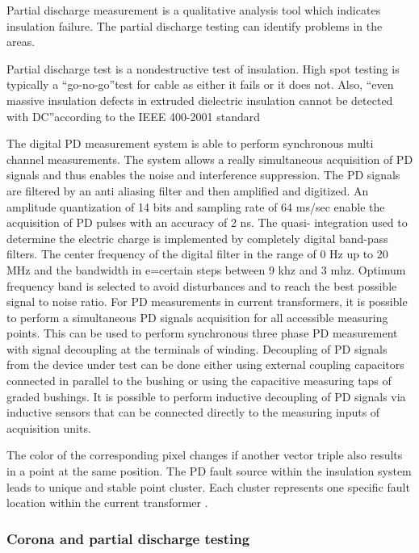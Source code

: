 Partial discharge measurement is a qualitative analysis tool which indicates insulation failure. The partial discharge testing can identify problems in the areas.

Partial discharge test is a nondestructive test of insulation. High spot testing is typically a \textquotedblleft go-no-go\textquotedblright test for cable as either it fails or it does not. Also, \textquotedblleft even massive insulation defects in extruded dielectric insulation cannot be detected with DC\textquotedblright according to the IEEE 400-2001 standard \cite{sundermannline}

The digital PD measurement system is able to perform synchronous multi channel measurements. The system allows a really simultaneous acquisition of PD signals and thus enables the noise and interference suppression. The PD signals are filtered by an anti aliasing filter and then amplified and digitized. An amplitude quantization of 14 bits and sampling rate of 64 ms/sec enable the acquisition of PD pulses with an accuracy of 2 ns. The quasi- integration used to determine the electric charge is implemented by completely digital band-pass filters. The center frequency of the digital filter in the range of 0 Hz up to 20 MHz and the bandwidth in e=certain steps between 9 khz and 3 mhz. Optimum frequency band is selected to avoid disturbances and to reach the best possible signal to noise ratio. For PD measurements in current transformers, it is possible to perform a simultaneous PD signals acquisition for all accessible measuring points. This can be used to perform synchronous three phase PD measurement with signal decoupling at the terminals of winding. Decoupling of PD signals from the device under test can be done either using external coupling capacitors connected in parallel to the bushing or using the capacitive measuring taps of graded bushings. It is possible to perform inductive decoupling of PD signals via inductive sensors that can be connected directly to the measuring inputs of acquisition units.

The color of the corresponding pixel changes if another vector triple also results in a point at the same position. The PD fault source within the insulation system leads to unique and stable point cluster. Each cluster represents one specific fault location within the current transformer \setlength{\parskip}{0em}\cite{sokolov1999effective}.

\subsubsection{Corona and partial discharge testing}

